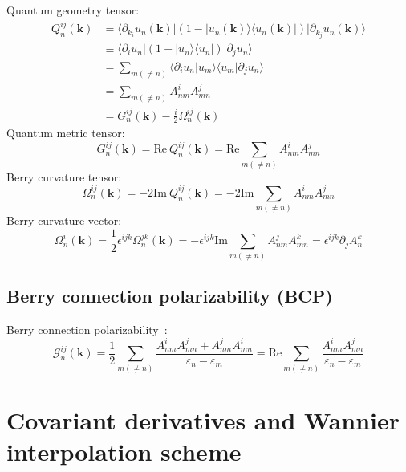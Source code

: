 \documentclass[prx,amsmath,amssymb,superscriptaddress,longbibliography]{revtex4-2}
\begin{document}
Quantum geometry tensor: 
\begin{align}
     Q_{n}^{ij}(\bm{k}) &=  \langle{\partial_{k_i} u_n(\bm{k})}|(1 - |u_n(\bm{k})\rangle\langle{u_n(\bm{k})}|)|{\partial_{k_j} u_n(\bm{k})}\rangle \nonumber \\
     &\equiv \langle \partial_{i} u_n |(1 - |u_n\rangle\langle u_n |)|{\partial_{j} u_n}\rangle  \nonumber  \\
     &= \sum_{m(\neq n)}  \langle \partial_i u_n | u_m \rangle\langle u_m | \partial_j u_n \rangle \nonumber \\
     &= \sum_{m(\neq n)}  A_{nm}^i A_{mn}^j \nonumber \\
     &= G_n^{ij}(\bm{k}) - \frac{i}{2}\Omega_n^{ij}(\bm{k}) 
\end{align}
Quantum metric tensor: 
\begin{equation}
    G_{n}^{ij}(\bm{k}) = \mathrm{Re}~Q_{n}^{ij}(\bm{k}) = \mathrm{Re} \sum_{m(\neq n)}  A_{nm}^i A_{mn}^j
\end{equation}
Berry curvature tensor:
\begin{equation}
    \Omega_{n}^{ij}(\bm{k}) = -2\mathrm{Im}~Q_{n}^{ij}(\bm{k}) = -2\mathrm{Im} \sum_{m(\neq n)}  A_{nm}^i A_{mn}^j
\end{equation}
Berry curvature vector:
\begin{equation}
    \Omega_{n}^{i}(\bm{k}) = \frac{1}{2}\epsilon^{ijk}\Omega_{n}^{jk}(\bm{k}) = -\epsilon^{ijk}\mathrm{Im} \sum_{m(\neq n)}  A_{nm}^j A_{mn}^k = \epsilon^{ijk} \partial_j A_n^k
\end{equation}

\subsection{Berry connection polarizability (BCP)}

Berry connection polarizability~\cite{GaoPRL2014FieldInducedPositional}: 
\begin{equation}
    \mathcal{G}_n^{ij}(\bm{k}) = \frac{1}{2} \sum_{m(\neq n)}  \frac{A_{nm}^i A_{mn}^j + A_{nm}^j A_{mn}^i}{\varepsilon_n - \varepsilon_m} = \mathrm{Re}\sum_{m(\neq n)}  \frac{A_{nm}^i A_{mn}^j}{\varepsilon_n - \varepsilon_m}
\end{equation}

\section{Covariant derivatives and Wannier interpolation scheme}
\end{document}
